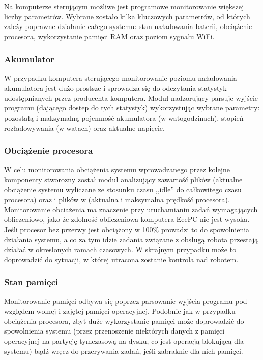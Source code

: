 Na komputerze sterującym możliwe jest programowe monitorowanie większej liczby
parametrów. Wybrane zostało kilka kluczowych parametrów, od których zależy
poprawne działanie całego systemu: stan naładowania baterii, obciążenie
procesora, wykorzystanie pamięci RAM oraz poziom sygnału WiFi.

\subsubsection{Akumulator}

W przypadku komputera sterującego monitorowanie poziomu naładowania akumulatora
jest dużo prostsze i sprowadza się do odczytania statystyk udostępnianych przez
producenta komputera. Moduł nadzorujący parsuje wyjście programu 
(dającego dostep do tych statystyk) wykorzystując wybrane parametry: pozostałą i
maksymalną pojemność akumulatora (w watogodzinach), stopień rozładowywania (w
watach) oraz aktualne napięcie.

\subsubsection{Obciążenie procesora}

W celu monitorowania obciążenia systemu wprowadzanego przez kolejne komponenty
stworozny został moduł analizujący zawartość plików  (aktualne
obciążenie systemu wyliczane ze stosunku czasu ,,idle'' do całkowitego czasu
procesora) oraz  i plików w 
(aktualna i maksymalna prędkość procesora). Monitorowanie obciażenia ma
znaczenie przy uruchamianiu zadań wymagających obliczeniowo, jako że zdolność
obliczeniowa komputera EeePC nie jest wysoka. Jeśli procesor bez przerwy jest
obciążony w 100\% prowadzi to do spowolnienia działania systemu, a co za tym
idzie zadania związane z obsługą robota przestają działać w okreslonych ramach
czasowych. W skrajnym przypadku może to doprowadzić do sytuacji, w której
utracona zostanie kontrola nad robotem.

\subsubsection{Stan pamięci}

Monitorowanie pamięci odbywa się poprzez parsowanie wyjścia programu 
pod względem wolnej i zajętej pamięci operacyjnej. Podobnie jak w przypadku
obciążenia procesora, zbyt duże wykorzystanie pamięci może doprowadzić do
spowolnienia systemu (przez przenoszenie niektórych danych z pamięci
operacyjnej na partycję tymczasową na dysku, co jest operacją blokującą dla
systemu) bądź wręcz do przerywania zadań, jeśli zabraknie dla nich pamięci.

